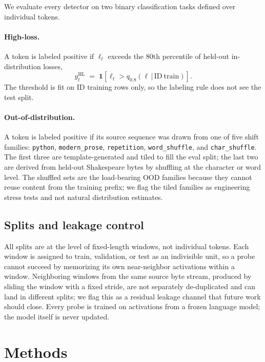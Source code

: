 \documentclass[11pt]{article}
\begin{document}
We evaluate every detector on two binary classification tasks defined over individual tokens.

\paragraph{High-loss.} A token is labeled positive if $\ell_t$ exceeds the $80$th percentile of held-out in-distribution losses,
\begin{equation}
  y^{\mathrm{HL}}_t \;=\; \mathbf{1}\!\left[\ell_t > q_{0.8}(\ell\,\vert\,\mathrm{ID\ train})\right].
\end{equation}
The threshold is fit on ID training rows only, so the labeling rule does not see the test split.

\paragraph{Out-of-distribution.} A token is labeled positive if its source sequence was drawn from one of five shift families: \texttt{python}, \texttt{modern\_prose}, \texttt{repetition}, \texttt{word\_shuffle}, and \texttt{char\_shuffle}. The first three are template-generated and tiled to fill the eval split; the last two are derived from held-out Shakespeare bytes by shuffling at the character or word level. The shuffled sets are the load-bearing OOD families because they cannot reuse content from the training prefix; we flag the tiled families as engineering stress tests and not natural distribution estimates.

\subsection{Splits and leakage control}\label{sec:splits}

All splits are at the level of fixed-length windows, not individual tokens. Each window is assigned to train, validation, or test as an indivisible unit, so a probe cannot succeed by memorizing its own near-neighbor activations within a window. Neighboring windows from the same source byte stream, produced by sliding the window with a fixed stride, are not separately de-duplicated and can land in different splits; we flag this as a residual leakage channel that future work should close. Every probe is trained on activations from a frozen language model; the model itself is never updated.

\section{Methods}
\end{document}

